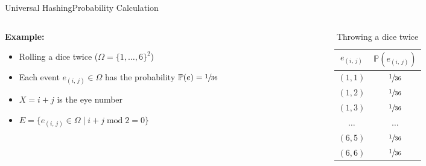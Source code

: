 \begin{frame}{Universal Hashing}{Probability Calculation}
  \begin{columns}
    \begin{column}{0.65\linewidth}
      \textbf{Example:}
      \begin{itemize}
        \item
          Rolling a dice twice ($\Omega = \{1,\dots,6\}^2$)
        \item
          Each event $e_{(i,\,j)} \in \Omega$ has the probability
          $\mathbb{P}(e) = \sfrac{1}{36}$
        \item
          $X = i + j$ is the eye number
        \item
          $E = \{e_{(i,\,j)} \in \Omega
            \mid i + j \;\mathrm{mod}\; 2 = 0\}$
      \end{itemize}
    \end{column}
    \begin{column}{0.35\linewidth}
      \begin{table}[!h]
        \caption{Throwing a dice twice}
        \label{tab:probabilities_rolling_dice_twice}
        \begin{tabularx}{0.8\linewidth}{c|c}
          $e_{(i,\,j)}$ & $\mathbb{P}(e_{(i,\,j)})$\\
          \midrule
          $(1, 1)$ & $\sfrac{1}{36}$\\
          $(1, 2)$ & $\sfrac{1}{36}$\\
          $(1, 3)$ & $\sfrac{1}{36}$\\
          $\dots$ & $\dots$\\
          $(6, 5)$ & $\sfrac{1}{36}$\\
          $(6, 6)$ & $\sfrac{1}{36}$\\
        \end{tabularx}
      \end{table}
    \end{column}
  \end{columns}
\end{frame}


